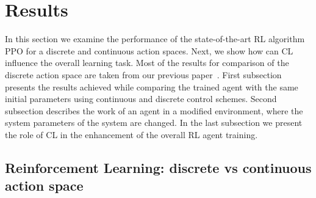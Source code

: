 \section{Results}

In this section we examine the performance of the state-of-the-art RL algorithm PPO for a discrete and continuous action spaces. Next, we show how can CL influence the overall learning task. Most of the results for comparison of the discrete action space are taken from our previous paper~\cite{manzl2023relrl}. First subsection presents the results achieved while comparing the trained agent with the same initial parameters using continuous and discrete control schemes. Second subsection describes the work of an agent in a modified environment, where the system parameters of the system are changed. In the last subsection we present the role of CL in the enhancement of the overall RL agent training. 

\subsection{Reinforcement Learning: discrete vs continuous action space} \label{Reinforcement Learning: discrete vs continuous action space}


